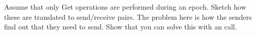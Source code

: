   Assume that only Get operations are performed during an epoch.
  Sketch how these are translated to send/receive pairs.
  The problem here is how the senders find out that they need to send.
  Show that you can solve this with an  call.
